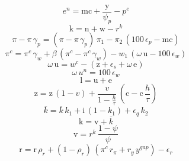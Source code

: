 \begin{dmath}
{{e^{n}}}={{\mathrm{mc}}}+\frac{{{\mathrm{y}}}}{{{\psi_{p}}}}-{{p^{e}}}
\end{dmath}
\begin{dmath}
{{\mathrm{k}}}={{\mathrm{n}}}+{{\mathrm{w}}}-{{r^{k}}}
\end{dmath}
\begin{dmath}
{{\pi}}-{{\pi}}\, {{\gamma_{p}}}=\left({{\pi}}-{{\pi}}\, {{\gamma_{p}}}\right)\, {{\pi_{1}}}-{{\pi_{2}}}\, \left(100\, {{\epsilon_{p}}}-{{\mathrm{mc}}}\right)
\end{dmath}
\begin{dmath}
{{\pi^{c}}}={{\pi^{c}}}\, {{\gamma_{w}}}+{{\beta}}\, \left({{\pi^{c}}}-{{\pi^{c}}}\, {{\gamma_{w}}}\right)-{{w_{1}}}\, \left({{\omega}}\, {{\mathrm{u}}}-100\, {{\epsilon_{w}}}\right)
\end{dmath}
\begin{dmath}
{{\omega}}\, {{\mathrm{u}}}={{w^{c}}}-\left({{\mathrm{z}}}+{{\epsilon_{s}}}+{{\omega}}\, {{\mathrm{e}}}\right)
\end{dmath}
\begin{dmath}
{{\omega}}\, {{u^{n}}}=100\, {{\epsilon_{w}}}
\end{dmath}
\begin{dmath}
{{\mathrm{l}}}={{\mathrm{u}}}+{{\mathrm{e}}}
\end{dmath}
\begin{dmath}
{{\mathrm{z}}}={{\mathrm{z}}}\, \left(1-{{v}}\right)+\frac{{{v}}}{1-\frac{{{h}}}{{{\tau}}}}\, \left({{\mathrm{c}}}-{{\mathrm{c}}}\, \frac{{{h}}}{{{\tau}}}\right)
\end{dmath}
\begin{dmath}
{{\bar{k}}}={{\bar{k}}}\, {{k_{1}}}+{{\mathrm{i}}}\, \left(1-{{k_{1}}}\right)+{{\epsilon_{q}}}\, {{k_{2}}}
\end{dmath}
\begin{dmath}
{{\mathrm{k}}}={{\mathrm{v}}}+{{\bar{k}}}
\end{dmath}
\begin{dmath}
{{\mathrm{v}}}={{r^{k}}}\, \frac{1-{{\psi}}}{{{\psi}}}
\end{dmath}
\begin{dmath}
{{\mathrm{r}}}={{\mathrm{r}}}\, {{\rho_{r}}}+\left(1-{{\rho_{r}}}\right)\, \left({{\pi^{c}}}\, {{r_{\pi}}}+{{r_{y}}}\, {{y^{gap}}}\right)-{{\epsilon_{r}}}
\end{dmath}
